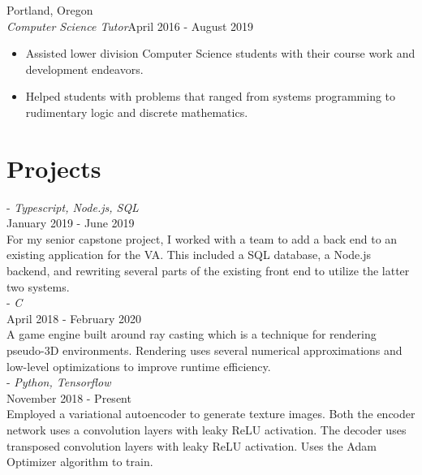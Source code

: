 \documentclass[12pt]{article}
\begin{document}
	\hfill Portland, Oregon\\
	\noindent\emph{Computer Science Tutor}\hfill April 2016 - August 2019
	\begin{itemize}[noitemsep]
		\item Assisted lower division Computer Science students with their course work and development endeavors.
		\item  Helped students with problems that ranged from systems programming to rudimentary logic and discrete mathematics.
	\end{itemize}


	\section*{Projects}
	 - \emph{Typescript, Node.js, SQL} \\
	\noindent January 2019 - June 2019 \\
	\noindent For my senior capstone project, I worked with a team to add a back end to an existing application for the VA.
	This included a SQL database, a Node.js backend, and rewriting several parts of the existing front end to utilize the latter two systems.
	\noindent \\

	\newpage
	 - \emph{C} \\
	\noindent April 2018 - February 2020 \\
	\noindent A game engine built around ray casting which is a technique for rendering pseudo-3D environments. Rendering uses several numerical 
	approximations and low-level optimizations to improve runtime efficiency.\\

	 - \emph{Python, Tensorflow} \\
	\noindent November 2018 - Present\\
	\noindent Employed a variational autoencoder to generate texture images. Both the encoder network uses a convolution layers with leaky ReLU activation.
	The decoder uses transposed convolution layers with leaky ReLU activation. Uses the Adam Optimizer algorithm to train.
	\noindent \\

	

\end{document}
